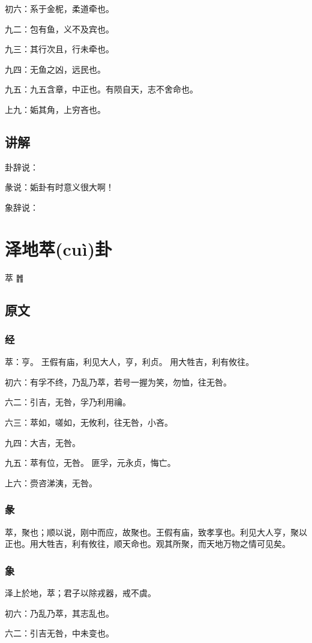 \documentclass[12pt,oneside]{book}
\begin{document}
初六：系于金柅，柔道牵也。

九二：包有鱼，义不及宾也。

九三：其行次且，行未牵也。

九四：无鱼之凶，远民也。

九五：九五含章，中正也。有陨自天，志不舍命也。

上九：姤其角，上穷吝也。


\section{讲解}
卦辞说：

彖说：姤卦有时意义很大啊！

象辞说：


\chapter{泽地萃(cuì)卦}
萃 {\Large ䷬}
\section{原文}

\subsection{经}
萃：亨。 王假有庙，利见大人，亨，利贞。 用大牲吉，利有攸往。

初六：有孚不终，乃乱乃萃，若号一握为笑，勿恤，往无咎。

六二：引吉，无咎，孚乃利用禴。

六三：萃如，嗟如，无攸利，往无咎，小吝。

九四：大吉，无咎。

九五：萃有位，无咎。 匪孚，元永贞，悔亡。

上六：赍咨涕洟，无咎。

\subsection{彖}
萃，聚也；顺以说，刚中而应，故聚也。王假有庙，致孝享也。利见大人亨，聚以正也。用大牲吉，利有攸往，顺天命也。观其所聚，而天地万物之情可见矣。

\subsection{象}
泽上於地，萃；君子以除戎器，戒不虞。

初六：乃乱乃萃，其志乱也。

六二：引吉无咎，中未变也。
\end{document}

